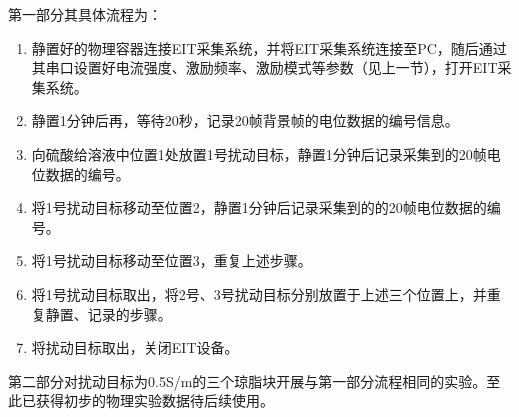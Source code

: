 第一部分其具体流程为：
\begin{enumerate}
    \item 静置好的物理容器连接EIT采集系统，并将EIT采集系统连接至PC，随后通过其串口设置好电流强度、激励频率、激励模式等参数（见上一节），打开EIT采集系统。
    \item 静置1分钟后再，等待20秒，记录20帧背景帧的电位数据的编号信息。
    \item 向硫酸给溶液中位置1处放置1号扰动目标，静置1分钟后记录采集到的20帧电位数据的编号。
    \item 将1号扰动目标移动至位置2，静置1分钟后记录采集到的的20帧电位数据的编号。
    \item 将1号扰动目标移动至位置3，重复上述步骤。
    \item 将1号扰动目标取出，将2号、3号扰动目标分别放置于上述三个位置上，并重复静置、记录的步骤。
    \item 将扰动目标取出，关闭EIT设备。
\end{enumerate}

第二部分对扰动目标为0.5S/m的三个琼脂块开展与第一部分流程相同的实验。至此已获得初步的物理实验数据待后续使用。

